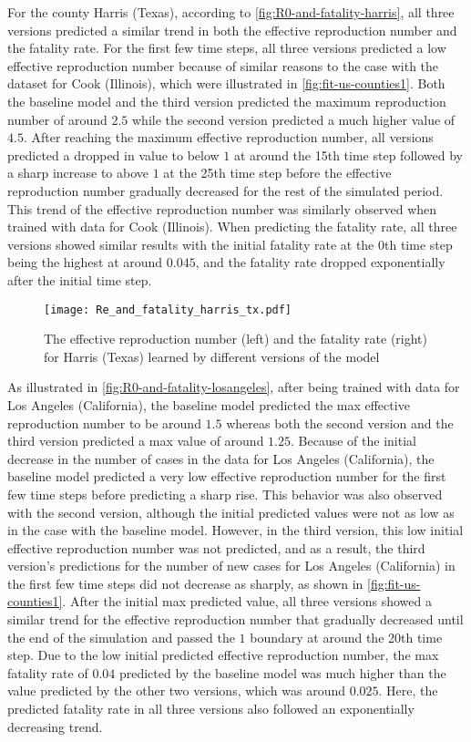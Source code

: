 For the county Harris (Texas), according to \autoref{fig:R0-and-fatality-harris}, all three versions predicted a similar trend in both the effective reproduction number and the fatality rate.
For the first few time steps, all three versions predicted a low effective reproduction number because of similar reasons to the case with the dataset for Cook (Illinois), which were illustrated in \autoref{fig:fit-us-counties1}.
Both the baseline model and the third version predicted the maximum reproduction number of around $2.5$ while the second version predicted a much higher value of $4.5$.
After reaching the maximum effective reproduction number, all versions predicted a dropped in value to below $1$ at around the 15th time step followed by a sharp increase to above $1$ at the 25th time step before the effective reproduction number gradually decreased for the rest of the simulated period.
This trend of the effective reproduction number was similarly observed when trained with data for Cook (Illinois).
When predicting the fatality rate, all three versions showed similar results with the initial fatality rate at the 0th time step being the highest at around $0.045$, and the fatality rate dropped exponentially after the initial time step.

\begin{figure}[!htb]
    \centering
    \texttt{[image: Re\_and\_fatality\_harris\_tx.pdf]}
    \caption{The effective reproduction number (left) and the fatality rate (right) for Harris (Texas) learned by different versions of the model}
    \label{fig:R0-and-fatality-harris}
\end{figure}

As illustrated in \autoref{fig:R0-and-fatality-losangeles}, after being trained with data for Los Angeles (California), the baseline model predicted the max effective reproduction number to be around $1.5$ whereas both the second version and the third version predicted a max value of around $1.25$.
Because of the initial decrease in the number of cases in the data for Los Angeles (California), the baseline model predicted a very low effective reproduction number for the first few time steps before predicting a sharp rise.
This behavior was also observed with the second version, although the initial predicted values were not as low as in the case with the baseline model.
However, in the third version, this low initial effective reproduction number was not predicted, and as a result, the third version's predictions for the number of new cases for Los Angeles (California) in the first few time steps did not decrease as sharply, as shown in \autoref{fig:fit-us-counties1}.
After the initial max predicted value, all three versions showed a similar trend for the effective reproduction number that gradually decreased until the end of the simulation and passed the $1$ boundary at around the 20th time step.
Due to the low initial predicted effective reproduction number, the max fatality rate of $0.04$ predicted by the baseline model was much higher than the value predicted by the other two versions, which was around $0.025$.
Here, the predicted fatality rate in all three versions also followed an exponentially decreasing trend.

